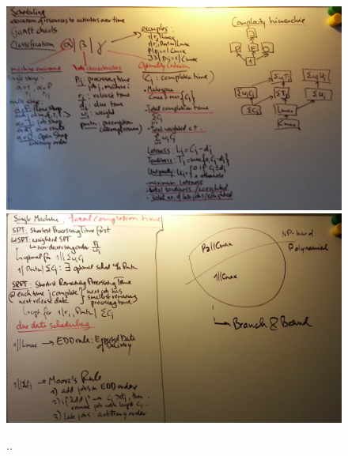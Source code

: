 \documentclass[a4paper,11pt,notitlepage]{article}
\begin{document}
\begin{figure}[ht!]
\centering
\includegraphics[width=180mm]{img/10.jpg}
\includegraphics[width=180mm]{img/11.jpg}
\caption{..}
\label{ideas}
\end{figure}
\end{document}
